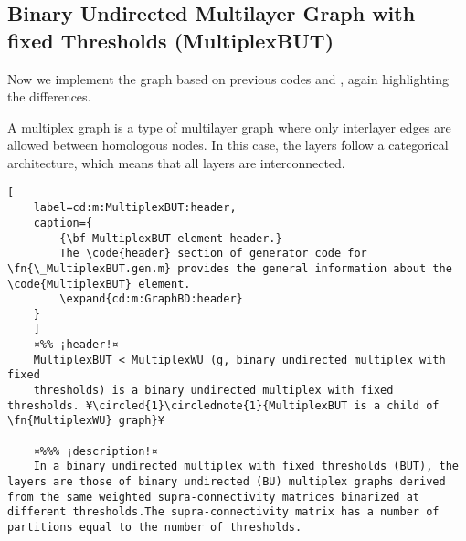 \documentclass{tufte-handout}
\begin{document}
\clearpage

\subsection{Binary Undirected Multilayer Graph with fixed Thresholds (MultiplexBUT)}

Now we implement the  graph based on previous codes  and , again highlighting the differences.

A multiplex graph is a type of multilayer graph where only interlayer edges are allowed between homologous nodes. In this case, the layers follow a categorical architecture, which means that all layers are interconnected.


\begin{lstlisting}[
	label=cd:m:MultiplexBUT:header,
	caption={
		{\bf MultiplexBUT element header.}
		The \code{header} section of generator code for \fn{\_MultiplexBUT.gen.m} provides the general information about the \code{MultiplexBUT} element.
		\expand{cd:m:GraphBD:header}
	}
	]
	¤%% ¡header!¤
	MultiplexBUT < MultiplexWU (g, binary undirected multiplex with fixed
	thresholds) is a binary undirected multiplex with fixed thresholds. ¥\circled{1}\circlednote{1}{MultiplexBUT is a child of \fn{MultiplexWU} graph}¥
	
	¤%%% ¡description!¤
	In a binary undirected multiplex with fixed thresholds (BUT), the layers are those of binary undirected (BU) multiplex graphs derived from the same weighted supra-connectivity matrices binarized at different thresholds.The supra-connectivity matrix has a number of partitions equal to the number of thresholds.

\end{lstlisting}
\end{document}
